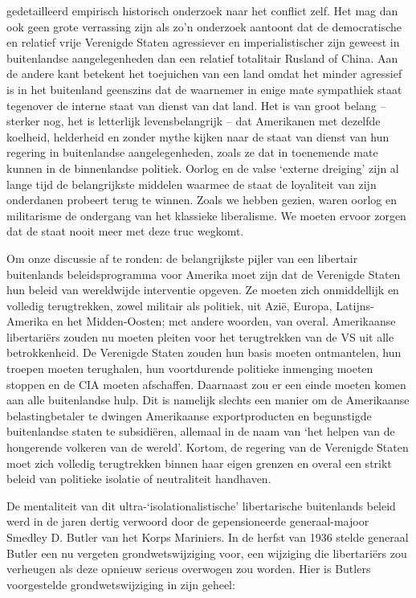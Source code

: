 \documentclass[
  a5paper,
  smalldemyvopaper,10pt,twoside,onecolumn,openright,extrafontsizes,hidelinks]{memoir}
\begin{document}
gedetailleerd empirisch historisch onderzoek naar het conflict zelf. Het
mag dan ook geen grote verrassing zijn als zo'n onderzoek aantoont dat
de democratische en relatief vrije Verenigde Staten agressiever en
imperialistischer zijn geweest in buitenlandse aangelegenheden dan een
relatief totalitair Rusland of China. Aan de andere kant betekent het
toejuichen van een land omdat het minder agressief is in het buitenland
geenszins dat de waarnemer in enige mate sympathiek staat tegenover de
interne staat van dienst van dat land. Het is van groot belang --
sterker nog, het is letterlijk levensbelangrijk -- dat Amerikanen met
dezelfde koelheid, helderheid en zonder mythe kijken naar de staat van
dienst van hun regering in buitenlandse aangelegenheden, zoals ze dat in
toenemende mate kunnen in de binnenlandse politiek. Oorlog en de valse
`externe dreiging' zijn al lange tijd de belangrijkste middelen waarmee
de staat de loyaliteit van zijn onderdanen probeert terug te winnen.
Zoals we hebben gezien, waren oorlog en militarisme de ondergang van het
klassieke liberalisme. We moeten ervoor zorgen dat de staat nooit meer
met deze truc wegkomt.

Om onze discussie af te ronden: de belangrijkste pijler van een
libertair buitenlands beleidsprogramma voor Amerika moet zijn dat de
Verenigde Staten hun beleid van wereldwijde interventie opgeven. Ze
moeten zich onmiddellijk en volledig terugtrekken, zowel militair als
politiek, uit Azië, Europa, Latijns-Amerika en het Midden-Oosten; met
andere woorden, van overal. Amerikaanse libertariërs zouden nu moeten
pleiten voor het terugtrekken van de VS uit alle betrokkenheid. De
Verenigde Staten zouden hun basis moeten ontmantelen, hun troepen moeten
terughalen, hun voortdurende politieke inmenging moeten stoppen en de
CIA moeten afschaffen. Daarnaast zou er een einde moeten komen aan alle
buitenlandse hulp. Dit is namelijk slechts een manier om de Amerikaanse
belastingbetaler te dwingen Amerikaanse exportproducten en begunstigde
buitenlandse staten te subsidiëren, allemaal in de naam van `het helpen
van de hongerende volkeren van de wereld'. Kortom, de regering van de
Verenigde Staten moet zich volledig terugtrekken binnen haar eigen
grenzen en overal een strikt beleid van politieke isolatie of
neutraliteit handhaven.

De mentaliteit van dit ultra-`isolationalistische' libertarische
buitenlands beleid werd in de jaren dertig verwoord door de
gepensioneerde generaal-majoor Smedley D. Butler van het Korps
Mariniers. In de herfst van 1936 stelde generaal Butler een nu vergeten
grondwetswijziging voor, een wijziging die libertariërs zou verheugen
als deze opnieuw serieus overwogen zou worden. Hier is Butlers
voorgestelde grondwetswijziging in zijn geheel:
\end{document}
